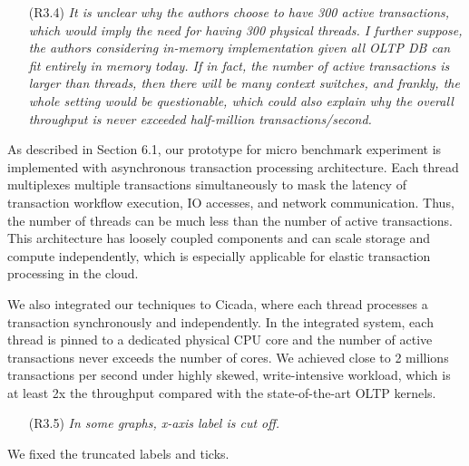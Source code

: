 \documentclass{article}
\newcommand{\changed}[1]{#1}
\newcommand{\changed}[1]{{\color{blue}#1}}
\begin{document}
\begin{itemize}
\item[(R3.4)] \emph{It is unclear why the authors choose to have 300 active transactions,
	which would imply the need for having 300 physical threads. I further
	suppose, the authors considering in-memory implementation given all OLTP
	DB can fit entirely in memory today. If in fact, the number of active
	transactions is larger than threads, then there will be many context switches,
	and frankly, the whole setting would be questionable, which could also
	explain why the overall throughput is never exceeded half-million
	transactions/second.}
\end{itemize}

\changed{
	As described in Section 6.1, our prototype for micro benchmark experiment is implemented with asynchronous transaction processing architecture. Each thread multiplexes multiple transactions simultaneously to mask the latency of transaction workflow execution, IO accesses, and network communication. Thus, the number of threads can be much less than the number of active transactions. This architecture has loosely coupled components and can scale storage and compute independently, which is especially applicable for elastic transaction processing in the cloud.

	We also integrated our techniques to Cicada, where each thread processes a transaction synchronously and independently. In the integrated system, each thread is pinned to a dedicated physical CPU core and the number of active transactions never exceeds the number of cores. We achieved close to 2 millions transactions per second under highly skewed, write-intensive workload, which is at least 2x the throughput compared with the state-of-the-art OLTP kernels.  
}

\begin{itemize}
\item[(R3.5)] \emph{In some graphs, x-axis label is cut off.}
\end{itemize}

\changed{
	We fixed the truncated labels and ticks.
}
\end{document}
